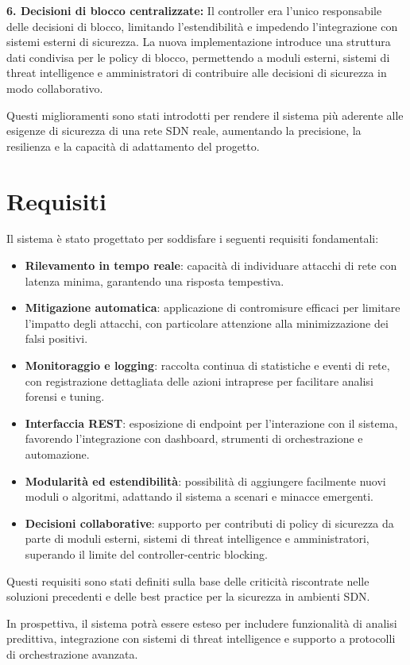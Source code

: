 \textbf{6. Decisioni di blocco centralizzate:} Il controller era l'unico responsabile delle decisioni di blocco, limitando l'estendibilità e impedendo l'integrazione con sistemi esterni di sicurezza. La nuova implementazione introduce una struttura dati condivisa per le policy di blocco, permettendo a moduli esterni, sistemi di threat intelligence e amministratori di contribuire alle decisioni di sicurezza in modo collaborativo.

Questi miglioramenti sono stati introdotti per rendere il sistema più aderente alle esigenze di sicurezza di una rete SDN reale, aumentando la precisione, la resilienza e la capacità di adattamento del progetto.

\section{Requisiti}
Il sistema è stato progettato per soddisfare i seguenti requisiti fondamentali:
\begin{itemize}
    \item \textbf{Rilevamento in tempo reale}: capacità di individuare attacchi di rete con latenza minima, garantendo una risposta tempestiva.
    \item \textbf{Mitigazione automatica}: applicazione di contromisure efficaci per limitare l'impatto degli attacchi, con particolare attenzione alla minimizzazione dei falsi positivi.
    \item \textbf{Monitoraggio e logging}: raccolta continua di statistiche e eventi di rete, con registrazione dettagliata delle azioni intraprese per facilitare analisi forensi e tuning.
    \item \textbf{Interfaccia REST}: esposizione di endpoint per l'interazione con il sistema, favorendo l'integrazione con dashboard, strumenti di orchestrazione e automazione.
    \item \textbf{Modularità ed estendibilità}: possibilità di aggiungere facilmente nuovi moduli o algoritmi, adattando il sistema a scenari e minacce emergenti.
    \item \textbf{Decisioni collaborative}: supporto per contributi di policy di sicurezza da parte di moduli esterni, sistemi di threat intelligence e amministratori, superando il limite del controller-centric blocking.
\end{itemize}
Questi requisiti sono stati definiti sulla base delle criticità riscontrate nelle soluzioni precedenti e delle best practice per la sicurezza in ambienti SDN.\par
In prospettiva, il sistema potrà essere esteso per includere funzionalità di analisi predittiva, integrazione con sistemi di threat intelligence e supporto a protocolli di orchestrazione avanzata.

